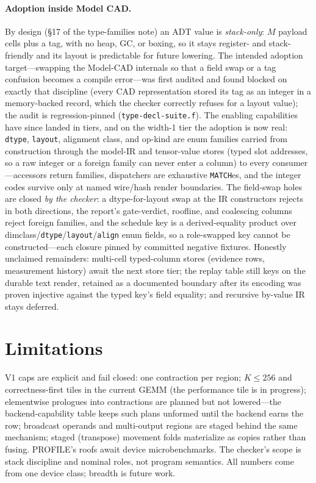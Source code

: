 \documentclass[11pt]{article}
\newcommand{\code}[1]{\texttt{#1}}
\begin{document}
\paragraph{Adoption inside Model CAD.} By design (\S17 of the
type-families note) an ADT value is \emph{stack-only}: $M$ payload cells plus a
tag, with no heap, GC, or boxing, so it stays register- and stack-friendly and
its layout is predictable for future lowering. The intended adoption
target---swapping the Model-CAD internals so that a field swap or a tag
confusion becomes a compile error---was first audited and found blocked on
exactly that discipline (every CAD representation stored its tag as an
integer in a memory-backed record, which the checker correctly refuses for a
layout value); the audit is regression-pinned (\code{type-decl-suite.f}).
The enabling capabilities have since landed in tiers, and on the width-1
tier the adoption is now real: \code{dtype}, \code{layout}, alignment
class, and op-kind are enum families carried from construction through the
model-IR and tensor-value stores (typed slot addresses, so a raw integer or
a foreign family can never enter a column) to every consumer---accessors
return families, dispatchers are exhaustive \code{MATCH}es, and the integer
codes survive only at named wire/hash render boundaries. The field-swap
holes are closed \emph{by the checker}: a dtype-for-layout swap at the IR
constructors rejects in both directions, the report's gate-verdict,
roofline, and coalescing columns reject foreign families, and the schedule
key is a derived-equality product over
dimclass/\code{dtype}/\code{layout}/\code{align} enum fields, so a
role-swapped key cannot be constructed---each closure pinned by committed
negative fixtures. Honestly unclaimed remainders: multi-cell typed-column
stores (evidence rows, measurement history) await the next store tier; the
replay table still keys on the durable text render, retained as a
documented boundary after its encoding was proven injective against the
typed key's field equality; and recursive by-value IR stays deferred.

\section{Limitations}
V1 caps are explicit and fail closed: one contraction per region;
$K\le256$ and correctness-first tiles in the current GEMM (the
performance tile is in progress); elementwise prologues into contractions
are planned but not lowered---the backend-capability table keeps such
plans unformed until the backend earns the row; broadcast operands and
multi-output regions are staged behind the same mechanism; staged
(transpose) movement folds materialize as copies rather than fusing.
PROFILE's roofs await device microbenchmarks. The checker's scope is
stack discipline and nominal roles, not program semantics. All numbers
come from one device class; breadth is future work.
\end{document}

